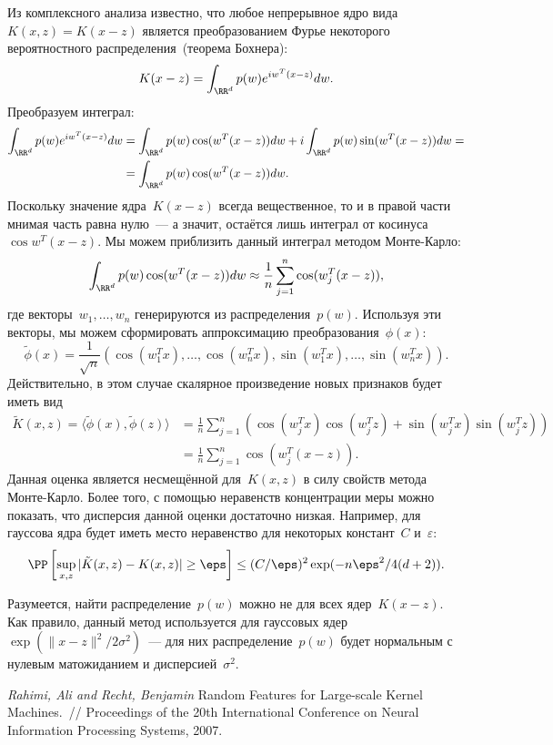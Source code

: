 \documentclass[12pt,fleqn]{article}
\begin{document}
Из комплексного анализа известно, что любое непрерывное ядро вида~$K(x, z) = K(x - z)$
является преобразованием Фурье некоторого вероятностного распределения~(теорема Бохнера):
\[
    K(x - z)
    =
    \int_{\RR^d}
        p(w)
        e^{i w^T (x - z)}
    dw.
\]
Преобразуем интеграл:
\begin{align*}
    \int_{\RR^d}
        p(w)
        e^{i w^T (x - z)}
    dw
    &=
    \int_{\RR^d}
        p(w)
        \cos(w^T (x - z))
    dw
    +
    i
    \int_{\RR^d}
        p(w)
        \sin(w^T (x - z))
    dw
    =\\
    &=
    \int_{\RR^d}
        p(w)
        \cos(w^T (x - z))
    dw.
\end{align*}
Поскольку значение ядра~$K(x - z)$ всегда вещественное,
то и в правой части мнимая часть равна нулю~---
а значит, остаётся лишь интеграл от косинуса~$\cos w^T (x - z)$.
Мы можем приблизить данный интеграл методом Монте-Карло:
\[
    \int_{\RR^d}
        p(w)
        \cos(w^T (x - z))
    dw
    \approx
    \frac{1}{n}
    \sum_{j = 1}^{n}
        \cos(w_j^T (x - z)),
\]
где векторы~$w_1, \dots, w_n$ генерируются из распределения~$p(w)$.
Используя эти векторы, мы можем сформировать аппроксимацию преобразования~$\phi(x)$:
\[
    \tilde \phi(x)
    =
    \frac{1}{\sqrt{n}}
    (\cos(w_1^T x), \dots, \cos(w_n^T x),
    \sin(w_1^T x), \dots, \sin(w_n^T x)).
\]
Действительно, в этом случае скалярное произведение новых признаков будет иметь вид
\begin{align*}
    \tilde K(x, z)
    =
    \langle \tilde \phi(x), \tilde \phi(z) \rangle
    &=
    \frac{1}{n}
    \sum_{j = 1}^{n} \left(
        \cos(w_j^T x) \cos(w_j^T z)
        +
        \sin(w_j^T x) \sin(w_j^T z)
    \right)\\
    &=
    \frac{1}{n}
    \sum_{j = 1}^{n}
        \cos(w_j^T (x - z)).
\end{align*}
Данная оценка является несмещённой для~$K(x, z)$ в силу свойств метода Монте-Карло.
Более того, с помощью неравенств концентрации меры можно показать, что дисперсия данной оценки достаточно низкая.
Например, для гауссова ядра будет иметь место неравенство для некоторых констант~$C$ и~$\varepsilon$:
\[
    \PP
    \left[
        \sup_{x, z}
        | \tilde K(x, z) - K(x, z) |
        \geq
        \eps
    \right]
    \leq
    (C / \eps)^2
    \exp(-n \eps^2 / 4(d + 2)).
\]

Разумеется, найти распределение~$p(w)$ можно не для всех ядер~$K(x - z)$.
Как правило, данный метод используется для гауссовых ядер~$\exp(\|x - z\|^2 / 2 \sigma^2)$~---
для них распределение~$p(w)$ будет нормальным  с нулевым матожиданием и дисперсией~$\sigma^2$.


\begin{thebibliography}{1}
    \emph{Rahimi, Ali and Recht, Benjamin}
    Random Features for Large-scale Kernel Machines.~//
    Proceedings of the 20th International Conference on Neural Information Processing Systems,
    2007.
\end{thebibliography}
\end{document}
